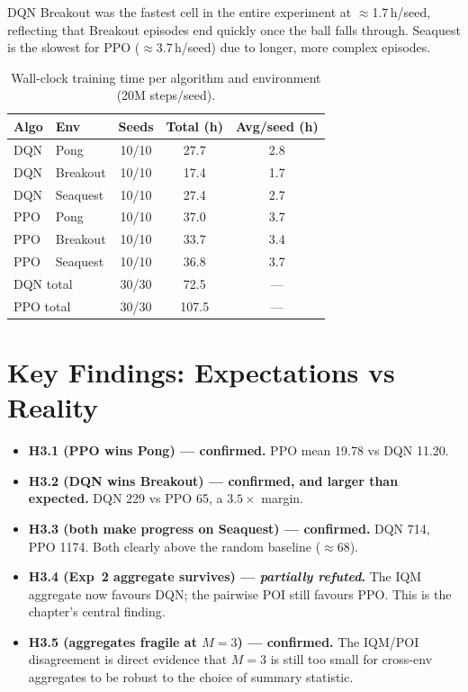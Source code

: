 DQN Breakout was the fastest cell in the entire experiment at $\approx$1.7\,h/seed,
reflecting that Breakout episodes end quickly once the ball falls through. Seaquest
is the slowest for PPO ($\approx$3.7\,h/seed) due to longer, more complex episodes.

\begin{table}[htbp!]
\centering
\caption[EXP3: Wall-clock training time]{Wall-clock training time per algorithm and environment (20M steps/seed).}
\label{tab:exp3-timing}
\begin{tabular}{llccc}
\toprule
\textbf{Algo} & \textbf{Env} & \textbf{Seeds} & \textbf{Total (h)} & \textbf{Avg/seed (h)} \\
\midrule
DQN & Pong     & 10/10 & 27.7 & 2.8 \\
DQN & Breakout & 10/10 & 17.4 & 1.7 \\
DQN & Seaquest & 10/10 & 27.4 & 2.7 \\
PPO & Pong     & 10/10 & 37.0 & 3.7 \\
PPO & Breakout & 10/10 & 33.7 & 3.4 \\
PPO & Seaquest & 10/10 & 36.8 & 3.7 \\
\midrule
\multicolumn{2}{l}{DQN total} & 30/30 & 72.5 & --- \\
\multicolumn{2}{l}{PPO total} & 30/30 & 107.5 & --- \\
\bottomrule
\end{tabular}
\vspace{0.5em}

\end{table}

\section{Key Findings: Expectations vs Reality}
\label{sec:exp3-key-findings}

\begin{itemize}
  \item \textbf{H3.1 (PPO wins Pong) --- confirmed.} PPO mean 19.78 vs DQN 11.20.
  \item \textbf{H3.2 (DQN wins Breakout) --- confirmed, and larger than expected.} DQN 229 vs PPO 65, a $3.5\times$ margin.
  \item \textbf{H3.3 (both make progress on Seaquest) --- confirmed.} DQN 714, PPO 1174. Both clearly above the random baseline ($\approx68$).
  \item \textbf{H3.4 (Exp~2 aggregate survives) --- \emph{partially refuted}.} The IQM aggregate now favours DQN; the pairwise POI still favours PPO. This is the chapter's central finding.
  \item \textbf{H3.5 (aggregates fragile at $M=3$) --- confirmed.} The IQM/POI disagreement is direct evidence that $M=3$ is still too small for cross-env aggregates to be robust to the choice of summary statistic.
\end{itemize}

